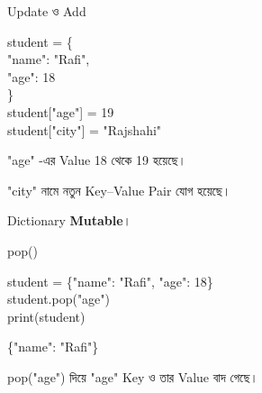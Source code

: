 \begin{codeoutputbox}{Update ও Add}

\noindent
\begin{minipage}[t]{0.56\linewidth}
\codeheading

\begin{english}
\ttfamily
student = \{\\
\hspace*{4mm}"name": "Rafi",\\
\hspace*{4mm}"age": 18\\
\}\\
student["age"] = 19\\
student["city"] = "Rajshahi"
\end{english}

\end{minipage}
\hfill
\begin{minipage}[t]{0.40\linewidth}
\outputheading

\textenglish{\ttfamily "age"}
-এর Value 18 থেকে 19 হয়েছে।

\medskip

\textenglish{\ttfamily "city"}
নামে নতুন Key--Value Pair যোগ হয়েছে।

\medskip

Dictionary \textbf{Mutable}।

\end{minipage}

\end{codeoutputbox}



\begin{codeoutputbox}{\textenglish{\ttfamily pop()}}

\noindent
\begin{minipage}[t]{0.54\linewidth}
\codeheading

\begin{english}
\ttfamily
student = \{"name": "Rafi", "age": 18\}\\
student.pop("age")\\
print(student)
\end{english}

\end{minipage}
\hfill
\begin{minipage}[t]{0.42\linewidth}
\outputheading

\begin{center}
\textenglish{\ttfamily \{"name": "Rafi"\}}
\end{center}

\textenglish{\ttfamily pop("age")}
দিয়ে
\textenglish{\ttfamily "age"}
Key ও তার Value বাদ গেছে।

\end{minipage}

\end{codeoutputbox}

